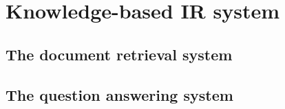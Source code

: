 \chapter{Knowledge-based IR system}\label{ch:knowledge_based_IR_system}

\section{The document retrieval system}

\section{The question answering system}